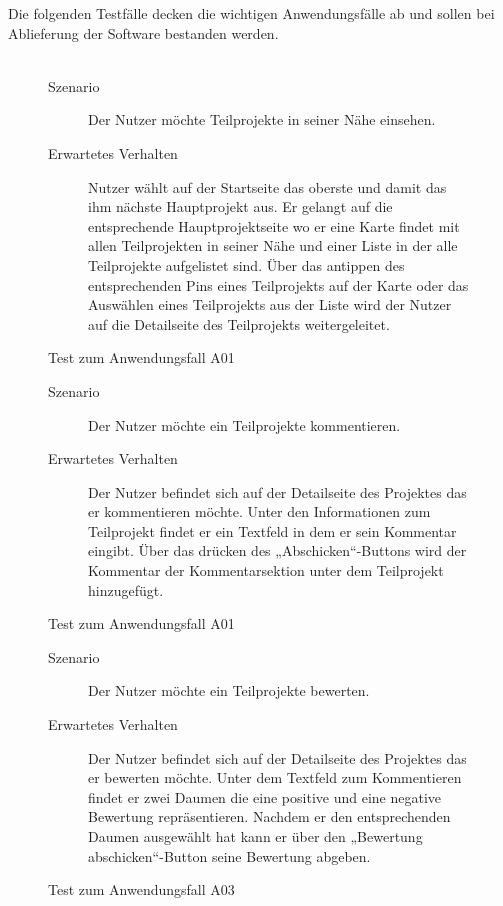 Die folgenden Testfälle decken die wichtigen Anwendungsfälle ab und sollen bei Ablieferung der Software bestanden werden.\\\\

\begin{figure}[!h]
	\begin{description}
	  \item[Szenario] Der Nutzer möchte Teilprojekte in seiner Nähe einsehen.
	  \item[Erwartetes Verhalten] Nutzer wählt auf der Startseite das oberste und damit das ihm nächste Hauptprojekt aus. Er gelangt auf die entsprechende Hauptprojektseite wo er eine Karte findet mit allen Teilprojekten in seiner Nähe und einer Liste in der alle Teilprojekte aufgelistet sind. Über das antippen des entsprechenden Pins eines Teilprojekts auf der Karte oder das Auswählen eines Teilprojekts aus der Liste wird der Nutzer auf die Detailseite des Teilprojekts weitergeleitet.
	\end{description}
	\caption{Test zum Anwendungsfall A01}
\end{figure}

\begin{figure}[!h]
	\begin{description}
	  \item[Szenario] Der Nutzer möchte ein Teilprojekte kommentieren. 
	  \item[Erwartetes Verhalten] Der Nutzer befindet sich auf der Detailseite des Projektes das er kommentieren möchte. Unter den Informationen zum Teilprojekt findet er ein Textfeld in dem er sein Kommentar eingibt. Über das drücken des „Abschicken“-Buttons wird der Kommentar der Kommentarsektion unter dem Teilprojekt hinzugefügt.
	\end{description}
	\caption{Test zum Anwendungsfall A01}
\end{figure}

\begin{figure}[!h]
	\begin{description}
	  \item[Szenario] Der Nutzer möchte ein Teilprojekte bewerten. 
	  \item[Erwartetes Verhalten] Der Nutzer befindet sich auf der Detailseite des Projektes das er bewerten möchte. Unter dem Textfeld zum Kommentieren findet er zwei Daumen die eine positive und eine negative Bewertung repräsentieren. Nachdem er den entsprechenden Daumen ausgewählt hat kann er über den „Bewertung abschicken“-Button seine Bewertung abgeben.
	\end{description}
	\caption{Test zum Anwendungsfall A03}
\end{figure}

